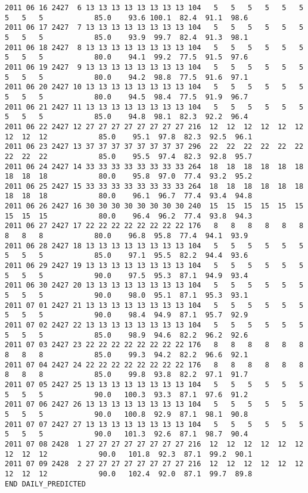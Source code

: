 \begin{landscape}
\begin{small}
\begin{verbatim}
2011 06 16 2427  6 13 13 13 13 13 13 13 13 104   5   5   5   5   5   5   5   5   5            85.0    93.6 100.1  82.4  91.1  98.6
2011 06 17 2427  7 13 13 13 13 13 13 13 13 104   5   5   5   5   5   5   5   5   5            85.0    93.9  99.7  82.4  91.3  98.1
2011 06 18 2427  8 13 13 13 13 13 13 13 13 104   5   5   5   5   5   5   5   5   5            80.0    94.1  99.2  77.5  91.5  97.6
2011 06 19 2427  9 13 13 13 13 13 13 13 13 104   5   5   5   5   5   5   5   5   5            80.0    94.2  98.8  77.5  91.6  97.1
2011 06 20 2427 10 13 13 13 13 13 13 13 13 104   5   5   5   5   5   5   5   5   5            80.0    94.5  98.4  77.5  91.9  96.7
2011 06 21 2427 11 13 13 13 13 13 13 13 13 104   5   5   5   5   5   5   5   5   5            85.0    94.8  98.1  82.3  92.2  96.4
2011 06 22 2427 12 27 27 27 27 27 27 27 27 216  12  12  12  12  12  12  12  12  12            85.0    95.1  97.8  82.3  92.5  96.1
2011 06 23 2427 13 37 37 37 37 37 37 37 37 296  22  22  22  22  22  22  22  22  22            85.0    95.5  97.4  82.3  92.8  95.7
2011 06 24 2427 14 33 33 33 33 33 33 33 33 264  18  18  18  18  18  18  18  18  18            80.0    95.8  97.0  77.4  93.2  95.2
2011 06 25 2427 15 33 33 33 33 33 33 33 33 264  18  18  18  18  18  18  18  18  18            80.0    96.1  96.7  77.4  93.4  94.8
2011 06 26 2427 16 30 30 30 30 30 30 30 30 240  15  15  15  15  15  15  15  15  15            80.0    96.4  96.2  77.4  93.8  94.3
2011 06 27 2427 17 22 22 22 22 22 22 22 22 176   8   8   8   8   8   8   8   8   8            80.0    96.8  95.8  77.4  94.1  93.9
2011 06 28 2427 18 13 13 13 13 13 13 13 13 104   5   5   5   5   5   5   5   5   5            85.0    97.1  95.5  82.2  94.4  93.6
2011 06 29 2427 19 13 13 13 13 13 13 13 13 104   5   5   5   5   5   5   5   5   5            90.0    97.5  95.3  87.1  94.9  93.4
2011 06 30 2427 20 13 13 13 13 13 13 13 13 104   5   5   5   5   5   5   5   5   5            90.0    98.0  95.1  87.1  95.3  93.1
2011 07 01 2427 21 13 13 13 13 13 13 13 13 104   5   5   5   5   5   5   5   5   5            90.0    98.4  94.9  87.1  95.7  92.9
2011 07 02 2427 22 13 13 13 13 13 13 13 13 104   5   5   5   5   5   5   5   5   5            85.0    98.9  94.6  82.2  96.2  92.6
2011 07 03 2427 23 22 22 22 22 22 22 22 22 176   8   8   8   8   8   8   8   8   8            85.0    99.3  94.2  82.2  96.6  92.1
2011 07 04 2427 24 22 22 22 22 22 22 22 22 176   8   8   8   8   8   8   8   8   8            85.0    99.8  93.8  82.2  97.1  91.7
2011 07 05 2427 25 13 13 13 13 13 13 13 13 104   5   5   5   5   5   5   5   5   5            90.0   100.3  93.3  87.1  97.6  91.2
2011 07 06 2427 26 13 13 13 13 13 13 13 13 104   5   5   5   5   5   5   5   5   5            90.0   100.8  92.9  87.1  98.1  90.8
2011 07 07 2427 27 13 13 13 13 13 13 13 13 104   5   5   5   5   5   5   5   5   5            90.0   101.3  92.6  87.1  98.7  90.4
2011 07 08 2428  1 27 27 27 27 27 27 27 27 216  12  12  12  12  12  12  12  12  12            90.0   101.8  92.3  87.1  99.2  90.1
2011 07 09 2428  2 27 27 27 27 27 27 27 27 216  12  12  12  12  12  12  12  12  12            90.0   102.4  92.0  87.1  99.7  89.8
END DAILY_PREDICTED


\end{verbatim}
\end{small}
\end{landscape}
